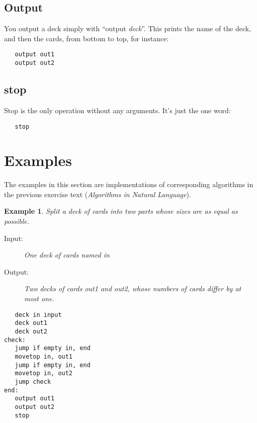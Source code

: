 \documentclass[a4paper,twoside]{tufte-handout}
\newtheorem{example}{Example}
\begin{document}
\subsection{Output}\label{sec-output}

You output a deck simply with ``output \emph{deck}''. This prints the
name of the deck, and then the cards, from bottom to top, for
instance:
\begin{lstlisting}
   output out1
   output out2
\end{lstlisting}

\subsection{stop}\label{sec-stop}

Stop is the only operation without any arguments. It's just the one word:
\begin{lstlisting}
   stop
\end{lstlisting}

\section{Examples}\label{sec-examp}

The examples in this section are implementations of corresponding
algorithms in the previous exercise text (\emph{Algorithms in Natural
  Language}).

\begin{example}
  Split a deck of cards into two parts whose sizes are as equal as possible.
  \begin{description}
  \item[Input:] One deck of cards named \emph{in}
  \item[Output:] Two decks of cards \emph{out1} and \emph{out2},
    whose numbers of cards differ by at most one.
  \end{description}
\begin{lstlisting}
   deck in input
   deck out1
   deck out2
check:
   jump if empty in, end
   movetop in, out1
   jump if empty in, end
   movetop in, out2
   jump check
end:
   output out1
   output out2
   stop
\end{lstlisting}
\end{example}
\end{document}
